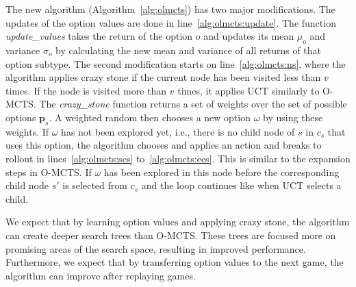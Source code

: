The new algorithm (Algorithm~\ref{alg:olmcts}) has two major
modifications. The updates of the option values are done in
line~\ref{alg:olmcts:update}. The function \emph{update\_values} takes the
return of the option $o$ and updates its mean $\mu_o$ and variance $\sigma_o$ by
calculating the new mean and variance of all returns of that option subtype. The
second modification starts on line~\ref{alg:olmcts:ns}, where the algorithm
applies crazy stone if the current node has been visited less than $v$ times.
If the node is visited more than $v$ times, it applies UCT similarly to
O-MCTS\@.  The \emph{crazy\_stone} function returns a set of weights over the
set of possible options $\mathbf{p}_s$. A weighted random then chooses a new
option $\omega$ by using these weights.  If $\omega$ has not been explored yet,
i.e., there is no child node of $s$ in $c_s$ that uses this option, the
algorithm chooses and applies an action and breaks to rollout in
lines~\ref{alg:olmcts:scs} to~\ref{alg:olmcts:ecs}. This is similar to the
expansion steps in O-MCTS\@. If $\omega$ has been explored in this node before
the corresponding child node $s'$ is selected from $c_s$ and the loop continues
like when UCT selects a child.

We expect that by learning option values and applying crazy stone, the algorithm
can create deeper search trees than O-MCTS\@. These trees are focused more on
promising areas of the search space, resulting in improved performance.
Furthermore, we expect that by transferring option values to the next game, the
algorithm can improve after replaying games.
